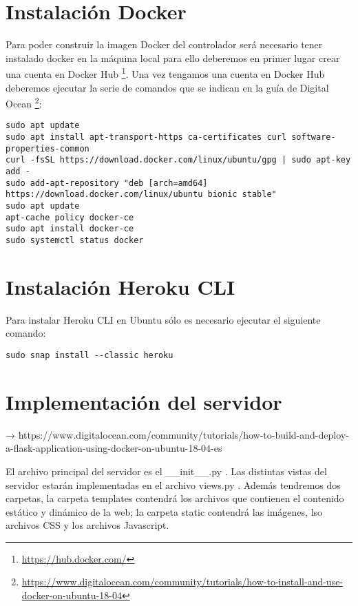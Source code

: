 \section{Instalación Docker} \label{sec:install_docker}

Para poder construir la imagen Docker del controlador será necesario tener instalado docker en la máquina local para ello deberemos en primer lugar crear una cuenta en Docker Hub \footnote{\url{https://hub.docker.com/}}. Una vez tengamos una cuenta en Docker Hub deberemos ejecutar la serie de comandos que se indican en la guía de Digital Ocean \footnote{\url{https://www.digitalocean.com/community/tutorials/how-to-install-and-use-docker-on-ubuntu-18-04}}:

\begin{lstlisting}
sudo apt update
sudo apt install apt-transport-https ca-certificates curl software-properties-common
curl -fsSL https://download.docker.com/linux/ubuntu/gpg | sudo apt-key add -
sudo add-apt-repository "deb [arch=amd64] https://download.docker.com/linux/ubuntu bionic stable"
sudo apt update
apt-cache policy docker-ce
sudo apt install docker-ce
sudo systemctl status docker
\end{lstlisting}


\section{Instalación Heroku CLI} \label{sec:install_heroku_CLI}

Para instalar Heroku CLI en Ubuntu sólo es necesario ejecutar el siguiente comando:

\begin{lstlisting}
sudo snap install --classic heroku
\end{lstlisting}



\section{Implementación del servidor}


→ https://www.digitalocean.com/community/tutorials/how-to-build-and-deploy-a-flask-application-using-docker-on-ubuntu-18-04-es


El archivo principal del servidor es el \_\_init\_\_.py . Las distintas vistas del servidor estarán implementadas en el archivo views.py . Además tendremos dos carpetas, la carpeta templates contendrá los archivos que contienen el contenido estático y dinámico de la web; la carpeta static contendrá las imágenes, lso archivos CSS y los archivos Javascript.


